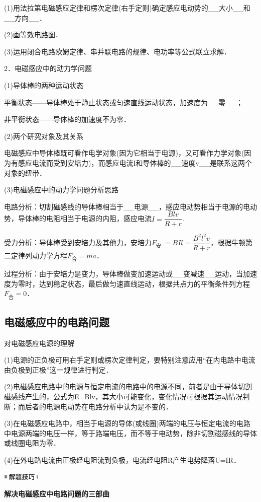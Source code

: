 \documentclass[cn,10.5pt,chinese,mac,chinesefont=founder]{elegantbook}
\begin{document}
(1)用法拉第电磁感应定律和楞次定律(右手定则)确定感应电动势的\_\_大小\_\_和\_\_方向\_\_．

(2)画等效电路图．

(3)运用闭合电路欧姆定律、串并联电路的规律、电功率等公式联立求解．

2．电磁感应中的动力学问题

(1)导体棒的两种运动状态

平衡状态------导体棒处于静止状态或匀速直线运动状态，加速度为\_\_零\_\_；

非平衡状态------导体棒的加速度不为零．

(2)两个研究对象及其关系

电磁感应中导体棒既可看作电学对象(因为它相当于电源)，又可看作力学对象(因为有感应电流而受到安培力)，而感应电流I和导体棒的\_\_速度v\_\_是联系这两个对象的纽带．

(3)电磁感应中的动力学问题分析思路

电路分析：切割磁感线的导体棒相当于\_\_电源\_\_，感应电动势相当于电源的电动势，导体棒的电阻相当于电源的内阻，感应电流$I=\dfrac{B l v}{R+r}$.　　

受力分析：导体棒受到安培力及其他力，安培力$F_{\text {安 }}=B I l=\dfrac{B^{2} l^{2} v}{R+r}$，根据牛顿第二定律列动力学方程$F_{\text{合}}=ma$．

过程分析：由于安培力是变力，导体棒做变加速运动或\_\_变减速\_\_运动，当加速度为零时，达到稳定状态，最后做匀速直线运动，根据共点力的平衡条件列方程$F_{\text{合}}=0$．
\newpage
\subsection{电磁感应中的电路问题}

对电磁感应电源的理解

(1)电源的正负极可用右手定则或楞次定律判定，要特别注意应用``在内电路中电流由负极到正极''这一规律进行判定．

(2)电磁感应电路中的电源与恒定电流的电路中的电源不同，前者是由于导体切割磁感线产生的，公式为E=Blv，其大小可能变化，变化情况可根据其运动情况判断；而后者的电源电动势在电路分析中认为是不变的．

(3)在电磁感应电路中，相当于电源的导体(或线圈)两端的电压与恒定电流的电路中电源两端的电压一样，等于路端电压，而不等于电动势，除非切割磁感线的导体或线圈电阻为零．

(4)在外电路电流由正极经电阻流到负极，电流经电阻R产生电势降落U=IR．

\begin{center}\includegraphics[width=0.70764in,height=0.12292in]{media/image37.png}\end{center}
\begin{center}
	\textbf{解决电磁感应中电路问题的三部曲}
\end{center}
\end{document}
